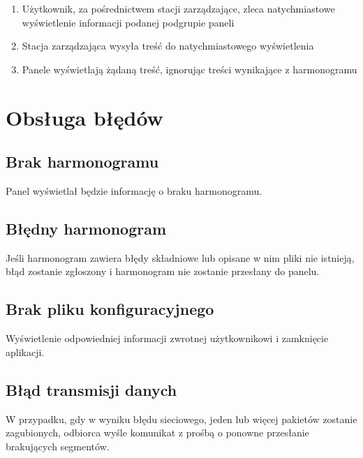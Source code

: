 \documentclass[12pt, a4paper]{article}
\providecommand{\tightlist}{%
  \setlength{\itemsep}{0pt}\setlength{\parskip}{0pt}}
\begin{document}
\begin{enumerate}
\def\labelenumi{\arabic{enumi}.}
\tightlist
\item
  Użytkownik, za pośrednictwem stacji zarządzające, zleca natychmiastowe
  wyświetlenie informacji podanej podgrupie paneli
\item
  Stacja zarządzająca wysyła treść do natychmiastowego wyświetlenia
\item
  Panele wyświetlają żądaną treść, ignorując treści wynikające z
  harmonogramu
\end{enumerate}

\hypertarget{obsux142uga-bux142ux119duxf3w}{%
\section{Obsługa błędów}\label{obsux142uga-bux142ux119duxf3w}}

\hypertarget{brak-harmonogramu}{%
\subsection{Brak harmonogramu}\label{brak-harmonogramu}}

Panel wyświetlał będzie informację o braku harmonogramu.

\hypertarget{bledny-harmonogram}{%
\subsection{Błędny harmonogram}\label{bledny-harmonogram}}

Jeśli harmonogram zawiera błędy składniowe lub opisane w nim pliki nie istnieją, błąd zostanie zgłoszony i harmonogram nie zostanie przesłany do panelu.

\hypertarget{brak-pliku-konfiguracyjnego}{%
\subsection{Brak pliku konfiguracyjnego}\label{brak-pliku-konfiguracyjnego}}

Wyświetlenie odpowiedniej informacji zwrotnej użytkownikowi i zamknięcie
aplikacji.

\hypertarget{bux142ux105d-transmisji-danych}{%
\subsection{Błąd transmisji danych}\label{bux142ux105d-transmisji-danych}}

W przypadku, gdy w wyniku błędu sieciowego, jeden lub więcej pakietów
zostanie zagubionych, odbiorca wyśle komunikat z prośbą o ponowne
przesłanie brakujących segmentów.
\end{document}
